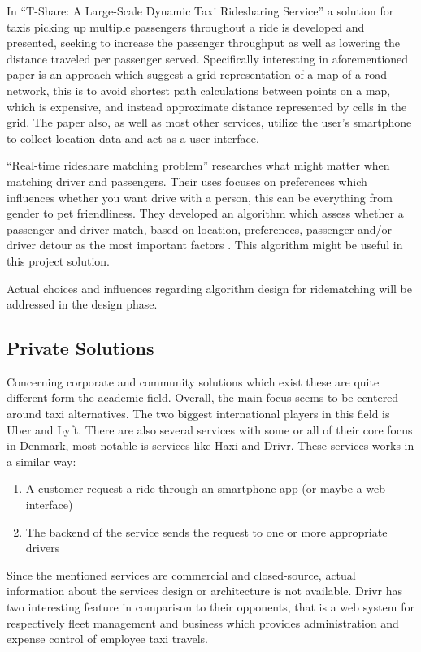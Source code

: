 In ``T-Share: A Large-Scale Dynamic Taxi Ridesharing Service'' \cite{ShuoMa2013} a solution for taxis picking up multiple passengers throughout a ride is developed and presented, seeking to increase the passenger throughput as well as lowering the distance traveled per passenger served.
Specifically interesting in aforementioned paper is an approach which suggest a grid representation of a map of a road network, this is to avoid shortest path calculations between points on a map, which is expensive, and instead approximate distance represented by cells in the grid.
The paper also, as well as most other services, utilize the user's smartphone to collect location data and act as a user interface.

``Real-time rideshare matching problem'' researches what might matter when matching driver and passengers.
Their uses focuses on preferences which influences whether you want drive with a person, this can be everything from gender to pet friendliness.
They developed an algorithm which assess whether a passenger and driver match, based on location, preferences, passenger and/or driver detour as the most important factors \cite{ghoseiri2011real}.
This algorithm might be useful in this project solution.

Actual choices and influences regarding algorithm design for ridematching will be addressed in the design phase. 

\subsection{Private Solutions}
Concerning corporate and community solutions which exist these are quite different form the academic field.
Overall, the main focus seems to be centered around taxi alternatives.
The two biggest international players in this field is Uber and Lyft.
There are also several services with some or all of their core focus in Denmark, most notable is services like Haxi and Drivr.
These services works in a similar way: 
\begin{enumerate}
	\item A customer request a ride through an smartphone app (or maybe a web interface)
	\item The backend of the service sends the request to one or more appropriate drivers
\end{enumerate}
Since the mentioned services are commercial and closed-source, actual information about the services design or architecture is not available.
Drivr has two interesting feature in comparison to their opponents, that is a web system for respectively fleet management and business which provides administration and expense control of employee taxi travels.

